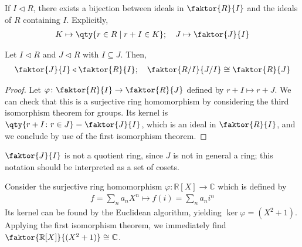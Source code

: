 \begin{remark}
	If $I \triangleleft R$, there exists a bijection between ideals in $\faktor{R}{I}$ and the ideals of $R$ containing $I$.
	Explicitly,
	\begin{align*}
		K \mapsto \qty{r \in R \mid r + I \in K};\quad J \mapsto \faktor{J}{I}
	\end{align*}
\end{remark}
\begin{theorem}
	Let $I \triangleleft R$ and $J \triangleleft R$ with $I \subseteq J$.
	Then,
	\begin{align*}
		\faktor{J}{I} \triangleleft \faktor{R}{I};\quad \faktor{R/I}{J/I} \cong \faktor{R}{J}
	\end{align*}
\end{theorem}
\begin{proof}
	Let $\varphi \colon \faktor{R}{I} \to \faktor{R}{J}$ defined by $r+I \mapsto r+J$.
	We can check that this is a surjective ring homomorphism by considering the third isomorphism theorem for groups.
	Its kernel is $\qty{r + I \colon r \in J} = \faktor{J}{I}$, which is an ideal in $\faktor{R}{I}$, and we conclude by use of the first isomorphism theorem.
\end{proof}
\begin{remark}
	$\faktor{J}{I}$ is not a quotient ring, since $J$ is not in general a ring; this notation should be interpreted as a set of cosets.
\end{remark}
\begin{example}
	Consider the surjective ring homomorphism $\varphi \colon \mathbb R[X] \to \mathbb C$ which is defined by
	\begin{align*}
		f = \sum_n a_n X^n \mapsto f(i) = \sum_n a_n i^n
	\end{align*}
	Its kernel can be found by the Euclidean algorithm, yielding $\ker \varphi = (X^2 + 1)$.
	Applying the first isomorphism theorem, we immediately find $\faktor{\mathbb R[X]}{(X^2 + 1)} \cong \mathbb C$.
\end{example}

